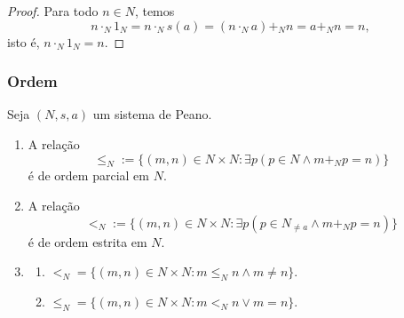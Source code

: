 \begin{proof}
    Para todo $n \in N$, temos
        \[
            n \cdot_N 1_N = n \cdot_N s(a) = (n \cdot_N a) +_N n = a +_N n = n,
        \]
    isto é, $n \cdot_N 1_N = n$. \blackproof
\end{proof}

\subsubsection{Ordem}

\begin{proposition}
    Seja $(N,s,a)$ um sistema de Peano.
        \begin{enumerate}[leftmargin=*, align=left, label=\textbf{(\alph*)}]
            \item A relação
                \[
                    {\leq_N} := \{(m,n) \in N \times N : \exists p (p \in N \land m +_N p=n) \}
                \]
            é de ordem parcial em $N$.
            \item A relação
                \[
                    {<_N} := \{(m,n) \in N \times N : \exists p (p \in N_{\neq a} \land m +_N p=n) \}
                \]
            é de ordem estrita em $N$.
            \item 
                \begin{enumerate}[label=\roman*.]
                    \item ${<_N} = \{(m,n) \in N \times N : m \leq_N n \land m \neq n\}$.
                    \item ${\leq_N} = \{(m,n) \in N \times N : m <_N n \lor m = n\}$.
                \end{enumerate}
        \end{enumerate}
\end{proposition}

